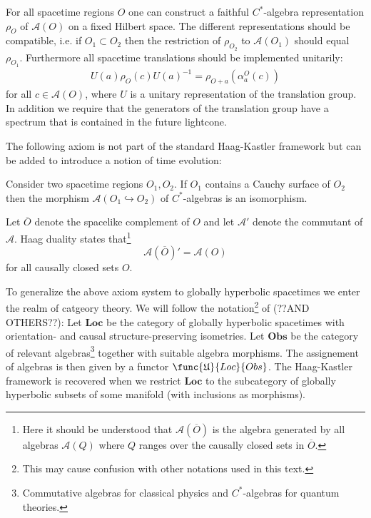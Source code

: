 	\begin{axiom}[Spectrum]
		For all spacetime regions $O$ one can construct a faithful $C^*$-algebra representation $\rho_O$ of $\mathcal{A}(O)$ on a fixed Hilbert space. The different representations should be compatible, i.e. if $O_1\subset O_2$ then the restriction of $\rho_{O_2}$ to $\mathcal{A}(O_1)$ should equal $\rho_{O_1}$. Furthermore all spacetime translations should be implemented unitarily:
		\begin{gather}
			U(a)\rho_O(c)U(a)^{-1} = \rho_{O+a}(\alpha^O_a(c))
		\end{gather}
		for all $c\in\mathcal{A}(O)$, where $U$ is a unitary representation of the translation group. In addition we require that the generators of the translation group have a spectrum that is contained in the future lightcone.
	\end{axiom}
	
	The following axiom is not part of the standard Haag-Kastler framework but can be added to introduce a notion of time evolution:
	\begin{axiom}
		Consider two spacetime regions $O_1, O_2$. If $O_1$ contains a Cauchy surface of $O_2$ then the morphism $\mathcal{A}(O_1\hookrightarrow O_2)$ of $C^*$-algebras is an isomorphism.
	\end{axiom}
	
	\begin{axiom}
		Let $\overline{O}$ denote the spacelike complement of $O$ and let $\mathcal{A}'$ denote the commutant of $\mathcal{A}$. Haag duality states that\footnote{Here it should be understood that $\mathcal{A}\left(\overline{O}\right)$ is the algebra generated by all algebras $\mathcal{A}(Q)$ where $Q$ ranges over the causally closed sets in $\overline{O}$.}
		\begin{equation}
			\mathcal{A}\left(\overline{O}\right)' = \mathcal{A}(O)
		\end{equation}
		for all causally closed sets $O$.
	\end{axiom}
	
	To generalize the above axiom system to globally hyperbolic spacetimes we enter the realm of catgeory theory. We will follow the notation\footnote{This may cause confusion with other notations used in this text.} of \cite{cal_strobl} (??AND OTHERS??): Let $\textbf{Loc}$ be the category of globally hyperbolic spacetimes with orientation- and causal structure-preserving isometries. Let $\textbf{Obs}$ be the category of relevant algebras\footnote{Commutative algebras for classical physics and $C^*$-algebras for quantum theories.} together with suitable algebra morphisms. The assignement of algebras is then given by a functor $\func{\mathfrak{U}}{Loc}{Obs}$. The Haag-Kastler framework is recovered when we restrict $\textbf{Loc}$ to the subcategory of globally hyperbolic subsets of some manifold (with inclusions as morphisms).
	
